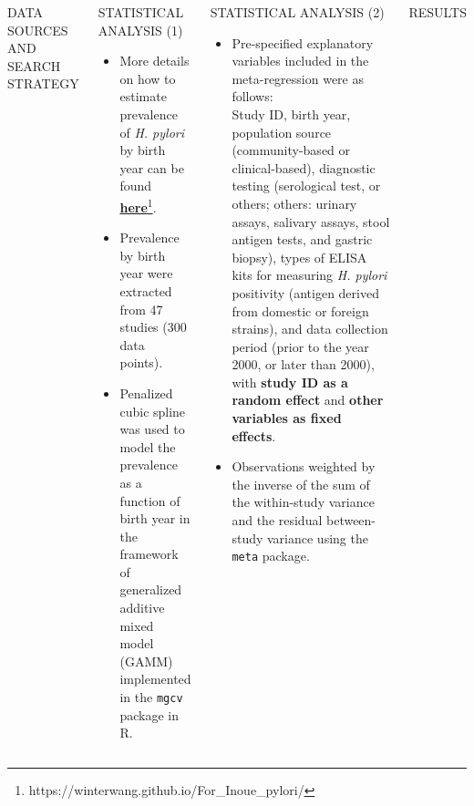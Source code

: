 \documentclass[english,xcolor=table,t
]{beamer}
\begin{document}
\begin{frame}
\begin{columns}
\begin{block}{DATA SOURCES AND SEARCH STRATEGY}
\caption{Figure 1: PRISMA Flowchart of Study Selection}

\end{block}

\begin{block}{STATISTICAL ANALYSIS (1)}

\begin{itemize}
\item
  More details on how to estimate prevalence of \emph{H. pylori} by
  birth year can be found
  \href{https://winterwang.github.io/For_Inoue_pylori/}{\textbf{here}}\footnote{https://winterwang.github.io/For\_Inoue\_pylori/}.
\item
  Prevalence by birth year were extracted from 47 studies (300 data
  points).
\item
  Penalized cubic spline was used to model the prevalence as a function
  of birth year in the framework of generalized additive mixed model
  (GAMM) implemented in the \texttt{mgcv} package in R.
\end{itemize}

\end{block}


\begin{block}{STATISTICAL ANALYSIS (2)}

\begin{itemize}
\item
  Pre-specified explanatory variables included in the meta-regression
  were as follows:\\
  Study ID, birth year, population source (community-based or
  clinical-based), diagnostic testing (serological test, or others;
  others: urinary assays, salivary assays, stool antigen tests, and
  gastric biopsy), types of ELISA kits for measuring \emph{H. pylori}
  positivity (antigen derived from domestic or foreign strains), and
  data collection period (prior to the year 2000, or later than 2000),
  with \textbf{study ID as a random effect} and \textbf{other variables
  as fixed effects}.
\item
  Observations weighted by the inverse of the sum of the within-study
  variance and the residual between-study variance using the
  \texttt{meta} package.
\end{itemize}

\end{block}

\begin{block}{RESULTS}


\end{block}
\end{columns}
\end{frame}
\end{document}
